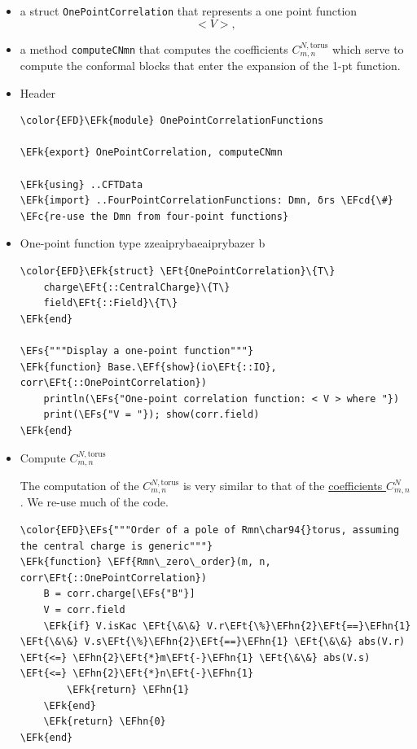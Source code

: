 \documentclass[a4paper]{article}
\numberwithin{equation}{section}
\newcommand{\EFc}[1]{\textcolor{EFc}{#1}} %
\newcommand{\EFcd}[1]{\textcolor{EFcd}{#1}} %
\newcommand{\EFs}[1]{\textcolor{EFs}{#1}} %
\newcommand{\EFk}[1]{\textcolor{EFk}{#1}} %
\newcommand{\EFf}[1]{\textcolor{EFf}{#1}} %
\newcommand{\EFt}[1]{\textcolor{EFt}{#1}} %
\newcommand{\EFhn}[1]{\textcolor{EFhn}{#1}} %
\begin{document}
\begin{itemize}
\item a struct \texttt{OnePointCorrelation} that represents a one point function \[
  < V >,
  \]
\item a method \texttt{computeCNmn} that computes the coefficients \(C^{N,\text{torus}}_{m,n}\) which serve to compute the conformal blocks that enter the expansion of the 1-pt function.
\end{itemize}
\begin{itemize}
\item Header
\label{sec:org965ffed}

\begin{Code}
\begin{Verbatim}
\color{EFD}\EFk{module} OnePointCorrelationFunctions

\EFk{export} OnePointCorrelation, computeCNmn

\EFk{using} ..CFTData
\EFk{import} ..FourPointCorrelationFunctions: Dmn, δrs \EFcd{\#} \EFc{re-use the Dmn from four-point functions}
\end{Verbatim}
\end{Code}
\item One-point function type
\label{sec:org465cfb9}
zzeaiprybaeaiprybazer b
\begin{Code}
\begin{Verbatim}
\color{EFD}\EFk{struct} \EFt{OnePointCorrelation}\{T\}
    charge\EFt{::CentralCharge}\{T\}
    field\EFt{::Field}\{T\}
\EFk{end}

\EFs{"""Display a one-point function"""}
\EFk{function} Base.\EFf{show}(io\EFt{::IO}, corr\EFt{::OnePointCorrelation})
    println(\EFs{"One-point correlation function: < V > where "})
    print(\EFs{"V = "}); show(corr.field)
\EFk{end}
\end{Verbatim}
\end{Code}
\item Compute \(C^{N,\text{torus}}_{m,n}\)
\label{sec:org491ba63}

The computation of the \(C^{N,\text{torus}}_{m,n}\) is very similar to that of the \hyperref[sec:orga71ddf8]{coefficients \(C^{N}_{m,n}\)}. We re-use much of the code.

\begin{Code}
\begin{Verbatim}
\color{EFD}\EFs{"""Order of a pole of Rmn\char94{}torus, assuming the central charge is generic"""}
\EFk{function} \EFf{Rmn\_zero\_order}(m, n, corr\EFt{::OnePointCorrelation})
    B = corr.charge[\EFs{"B"}]
    V = corr.field
    \EFk{if} V.isKac \EFt{\&\&} V.r\EFt{\%}\EFhn{2}\EFt{==}\EFhn{1} \EFt{\&\&} V.s\EFt{\%}\EFhn{2}\EFt{==}\EFhn{1} \EFt{\&\&} abs(V.r) \EFt{<=} \EFhn{2}\EFt{*}m\EFt{-}\EFhn{1} \EFt{\&\&} abs(V.s) \EFt{<=} \EFhn{2}\EFt{*}n\EFt{-}\EFhn{1}
        \EFk{return} \EFhn{1}
    \EFk{end}
    \EFk{return} \EFhn{0}
\EFk{end}


\end{Verbatim}
\end{Code}
\end{itemize}
\end{document}
